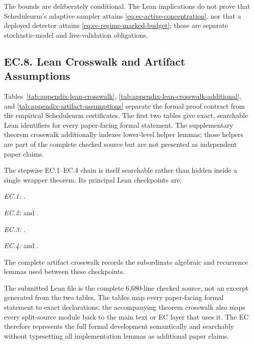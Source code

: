 \documentclass[opre,dblanonrev]{informs4}
\begin{document}
The bounds are deliberately conditional.  The Lean implications do not prove
that Scheduleurm's adaptive sampler attains
\eqref{eq:ec-active-concentration}, nor that a deployed detector attains
\eqref{eq:ec-regime-marked-budget}; those are separate stochastic-model and
live-validation obligations.

\subsection*{EC.8. Lean Crosswalk and Artifact Assumptions}

Tables~\ref{tab:appendix-lean-crosswalk},
\ref{tab:appendix-lean-crosswalk-additional}, and
\ref{tab:appendix-artifact-assumptions} separate the formal proof contract from
the empirical Scheduleurm certificates.  The first two tables give exact,
searchable Lean identifiers for every paper-facing formal statement.  The
supplementary theorem crosswalk additionally indexes lower-level helper lemmas;
those helpers are part of the complete checked source but are not presented as
independent paper claims.

The stepwise EC.1--EC.4 chain is itself searchable rather than hidden inside a
single wrapper theorem.  Its principal Lean checkpoints are:
{\small\raggedright
\noindent\textit{EC.1:}
.\par
\noindent\textit{EC.2:}
 and
.\par
\noindent\textit{EC.3:}
.\par
\noindent\textit{EC.4:}
 and
.\par
\par}
The complete artifact crosswalk records the subordinate algebraic and
recurrence lemmas used between these checkpoints.

The submitted Lean file is the complete 6,680-line checked source, not an
excerpt generated from the two tables.  The tables map every paper-facing
formal statement to exact declarations; the accompanying theorem crosswalk
also maps every split-source module back to the main text or EC layer that uses
it.  The EC therefore represents the full formal development semantically and
searchably without typesetting all implementation lemmas as additional paper
claims.
\end{document}
